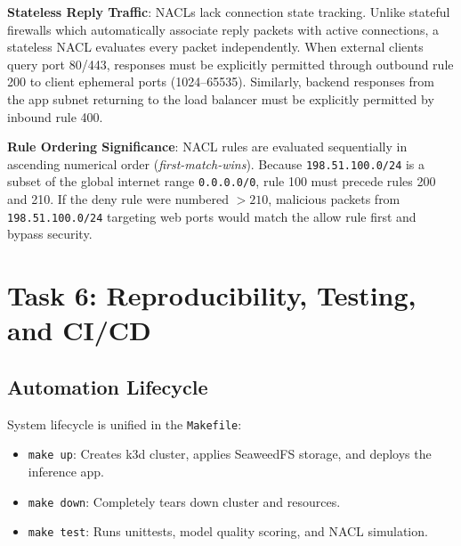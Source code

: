 \documentclass[10pt,a4paper]{article}
\begin{document}
\noindent\textbf{Stateless Reply Traffic}: NACLs lack connection state tracking. Unlike stateful firewalls which automatically associate reply packets with active connections, a stateless NACL evaluates every packet independently. When external clients query port 80/443, responses must be explicitly permitted through outbound rule 200 to client ephemeral ports (1024--65535). Similarly, backend responses from the app subnet returning to the load balancer must be explicitly permitted by inbound rule 400.

\noindent\textbf{Rule Ordering Significance}: NACL rules are evaluated sequentially in ascending numerical order (\textit{first-match-wins}). Because \texttt{198.51.100.0/24} is a subset of the global internet range \texttt{0.0.0.0/0}, rule 100 must precede rules 200 and 210. If the deny rule were numbered $>210$, malicious packets from \texttt{198.51.100.0/24} targeting web ports would match the allow rule first and bypass security.

\section{Task 6: Reproducibility, Testing, and CI/CD}

\subsection{Automation Lifecycle}
System lifecycle is unified in the \texttt{Makefile}:
\begin{itemize}\setlength\itemsep{0em}
    \item \texttt{make up}: Creates k3d cluster, applies SeaweedFS storage, and deploys the inference app.
    \item \texttt{make down}: Completely tears down cluster and resources.
    \item \texttt{make test}: Runs unittests, model quality scoring, and NACL simulation.
\end{itemize}
\end{document}
